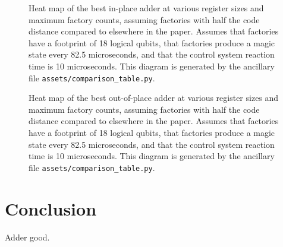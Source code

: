 \documentclass[onecolumn,unpublished]{quantumarticle}
\theoremstyle{definition}
\theoremstyle{definition}
\theoremstyle{definition}
\begin{document}
\begin{figure}
    \centering
    \caption{
        Heat map of the best in-place adder at various register sizes and maximum factory counts, assuming factories with half the code distance compared to elsewhere in the paper.
        Assumes that factories have a footprint of 18 logical qubits, that factories produce a magic state every 82.5 microseconds, and that the control system reaction time is 10 microseconds.
        This diagram is generated by the ancillary file \texttt{assets/comparison\_table.py}.
    }
    \label{fig:my_label}
\end{figure}

\begin{figure}
    \centering
    \caption{
        Heat map of the best out-of-place adder at various register sizes and maximum factory counts, assuming factories with half the code distance compared to elsewhere in the paper.
        Assumes that factories have a footprint of 18 logical qubits, that factories produce a magic state every 82.5 microseconds, and that the control system reaction time is 10 microseconds.
        This diagram is generated by the ancillary file \texttt{assets/comparison\_table.py}.
    }
    \label{fig:my_label}
\end{figure}

\section{Conclusion}
\label{sec:conclusion}

Adder good.



\end{document}
